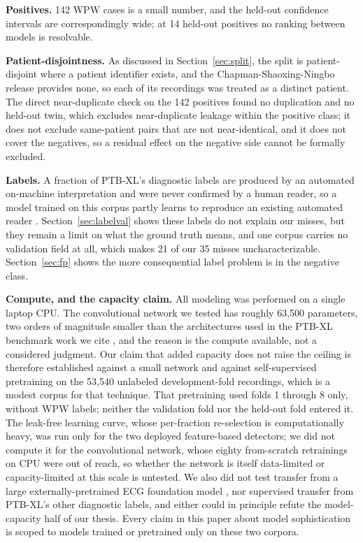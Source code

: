 \documentclass[11pt]{article}
\begin{document}
\textbf{Positives.} 142 WPW cases is a small number, and the held-out confidence intervals are correspondingly wide; at 14 held-out positives no ranking between models is resolvable.

\textbf{Patient-disjointness.} As discussed in Section~\ref{sec:split}, the split is patient-disjoint where a patient identifier exists, and the Chapman-Shaoxing-Ningbo release provides none, so each of its recordings was treated as a distinct patient. The direct near-duplicate check on the 142 positives found no duplication and no held-out twin, which excludes near-duplicate leakage within the positive class; it does not exclude same-patient pairs that are not near-identical, and it does not cover the negatives, so a residual effect on the negative side cannot be formally excluded.

\textbf{Labels.} A fraction of PTB-XL's diagnostic labels are produced by an automated on-machine interpretation and were never confirmed by a human reader, so a model trained on this corpus partly learns to reproduce an existing automated reader \cite{karimi}. Section~\ref{sec:labelval} shows these labels do not explain our misses, but they remain a limit on what the ground truth means, and one corpus carries no validation field at all, which makes 21 of our 35 misses uncharacterizable. Section~\ref{sec:fp} shows the more consequential label problem is in the negative class.

\textbf{Compute, and the capacity claim.} All modeling was performed on a single laptop CPU. The convolutional network we tested has roughly 63{,}500 parameters, two orders of magnitude smaller than the architectures used in the PTB-XL benchmark work we cite \cite{strodthoff}, and the reason is the compute available, not a considered judgment. Our claim that added capacity does not raise the ceiling is therefore established against a small network and against self-supervised pretraining \cite{mehari} on the 53{,}540 unlabeled development-fold recordings, which is a modest corpus for that technique. That pretraining used folds 1 through 8 only, without WPW labels; neither the validation fold nor the held-out fold entered it. The leak-free learning curve, whose per-fraction re-selection is computationally heavy, was run only for the two deployed feature-based detectors; we did not compute it for the convolutional network, whose eighty from-scratch retrainings on CPU were out of reach, so whether the network is itself data-limited or capacity-limited at this scale is untested. We also did not test transfer from a large externally-pretrained ECG foundation model \cite{ecgfm,hubert}, nor supervised transfer from PTB-XL's other diagnostic labels, and either could in principle refute the model-capacity half of our thesis. Every claim in this paper about model sophistication is scoped to models trained or pretrained only on these two corpora.
\end{document}
